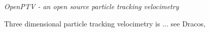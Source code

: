 \textit{OpenPTV - an open source particle tracking velocimetry} 

Three dimensional particle tracking velocimetry is ... see Dracos, \cite{1996}
